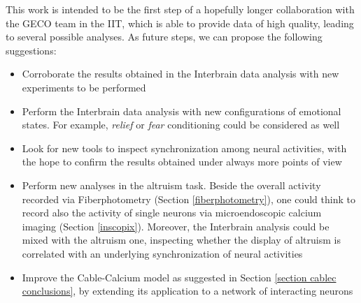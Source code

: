 \documentclass[12pt, a4paper]{report}
\begin{document}
This work is intended to be the first step of a hopefully longer collaboration with the GECO team in the IIT, which is able to provide data of high quality, leading to several possible analyses. As future steps, we can propose the following suggestions:

\begin{itemize}
	\item Corroborate the results obtained in the Interbrain data analysis with new experiments to be performed
	
	\item Perform the Interbrain data analysis with new configurations of emotional states. For example, \textit{relief} or \textit{fear} conditioning could be considered as well
	
	
	\item Look for new tools to inspect synchronization among neural activities, with the hope to confirm the results obtained under always more points of view
	
	\item Perform new analyses in the altruism task. Beside the overall activity recorded via Fiberphotometry (Section \ref{fiberphotometry}), one could think to record also the activity of single neurons via microendoscopic calcium imaging (Section \ref{inscopix}). Moreover, the Interbrain analysis could be mixed with the altruism one, inspecting whether the display of altruism is correlated with an underlying synchronization of neural activities
	
	\item Improve the Cable-Calcium model as suggested in Section \ref{section cablec conclusions}, by extending its application to a network of interacting neurons
\end{itemize}
\end{document}
